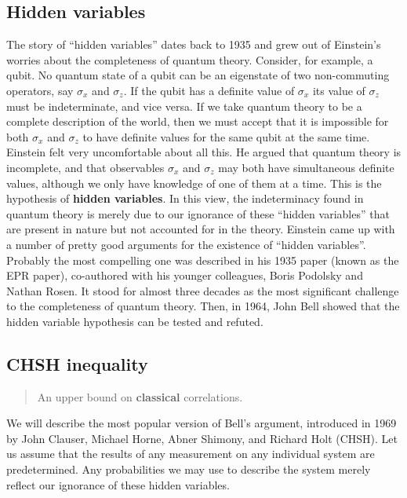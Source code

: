 \documentclass[fleqn]{article}
\begin{document}
\hypertarget{hidden-variables}{%
\subsection{Hidden variables}\label{hidden-variables}}

The story of ``hidden variables'' dates back to 1935 and grew out of Einstein's worries about the completeness of quantum theory.
Consider, for example, a qubit.
No quantum state of a qubit can be an eigenstate of two non-commuting operators, say \(\sigma_x\) and \(\sigma_z\).
If the qubit has a definite value of \(\sigma_x\) its value of \(\sigma_z\) must be indeterminate, and vice versa.
If we take quantum theory to be a complete description of the world, then we must accept that it is impossible for both \(\sigma_x\) and \(\sigma_z\) to have definite values for the same qubit at the same time.
Einstein felt very uncomfortable about all this.
He argued that quantum theory is incomplete, and that observables \(\sigma_x\) and \(\sigma_z\) may both have simultaneous definite values, although we only have knowledge of one of them at a time.
This is the hypothesis of \textbf{hidden variables}.
In this view, the indeterminacy found in quantum theory is merely due to our ignorance of these ``hidden variables'' that are present in nature but not accounted for in the theory.
Einstein came up with a number of pretty good arguments for the existence of ``hidden variables''.
Probably the most compelling one was described in his 1935 paper (known as the EPR paper), co-authored with his younger colleagues, Boris Podolsky and Nathan Rosen.
It stood for almost three decades as the most significant challenge to the completeness of quantum theory.
Then, in 1964, John Bell showed that the hidden variable hypothesis can be tested and refuted.

\hypertarget{chsh-inequality}{%
\subsection{CHSH inequality}\label{chsh-inequality}}

\begin{quote}
An upper bound on \textbf{classical} correlations.
\end{quote}

We will describe the most popular version of Bell's argument, introduced in 1969 by John Clauser, Michael Horne, Abner Shimony, and Richard Holt (CHSH).
Let us assume that the results of any measurement on any individual system are predetermined.
Any probabilities we may use to describe the system merely reflect our ignorance of these hidden variables.
\end{document}
